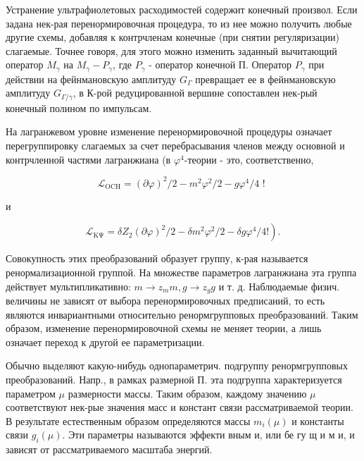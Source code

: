 \documentclass[10pt]{article}
\begin{document}
Устранение ультрафиолетовых расходимостей содержит конечный произвол. Если задана нек-рая перенормировочная процедура, то из нее можно получить любые другие схемы, добавляя к контрчленам конечные (при снятии регуляризации) слагаемые. Точнее говоря, для этого можно изменить заданный вычитающий оператор $M_{\gamma}$ на $M_{\gamma}-P_{\gamma}$, где $P_{\gamma}$ - оператор конечной П. Оператор $P_{\gamma}$ при действии на фейнмановскую амплитуду $G_{\Gamma}$ превращает ее в фейнмановскую амплитуду $G_{\Gamma / \gamma}$, в К-рой редуцированной вершине сопоставлен нек-рый конечный полином по импульсам.



На лагранжевом уровне изменение перенормировочной процедуры означает перегруппировку слагаемых за счет перебрасывания членов между основной и контрчленной частями лагранжиана (в $\varphi^{4}$-теории - это, соответственно,



\[

\mathscr{L}_{\mathrm{OCH}}=(\partial \varphi)^{2} / 2-m^{2} \varphi^{2} / 2-g \varphi^{4} / 4 \text { ! }

\]



и



\[

\left.\mathscr{L}_{\mathrm{K \Psi}}=\delta Z_{2}(\partial \varphi)^{2} / 2-\delta m^{2} \varphi^{2} / 2-\delta g \varphi^{4} / 4 !\right) .

\]



Совокупность этих преобразований образует группу, к-рая называется ренормализационной группой. На множестве параметров лагранжиана эта группа действует мультипликативно: $m \rightarrow z_{m} m, g \rightarrow z_{g} g$ и т. д. Наблюдаемые физич. величины не зависят от выбора перенормировочных предписаний, то есть являются инвариантными относительно ренормгрупповых преобразований. Таким образом, изменение перенормировочной схемы не меняет теории, а лишь означает переход к другой ее параметризации.



Обычно выделяют какую-нибудь однопараметрич. подгруппу ренормгрупповых преобразований. Напр., в рамках размерной П. эта подгруппа характеризуется параметром $\mu$ размерности массы. Таким образом, каждому значению $\mu$ соответствуют нек-рые значения масс и констант связи рассматриваемой теории. В результате естественным образом определяются массы $m_{i}(\mu)$ и константы связи $g_{i}(\mu)$. Эти параметры называются эффекти вным и, или бе гу щ и м и, и зависят от рассматриваемого масштаба энергий.
\end{document}
